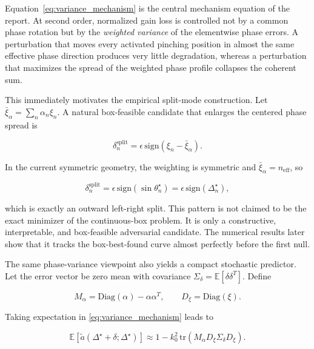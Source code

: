 Equation~\eqref{eq:variance_mechanism} is the central mechanism equation of the report. At second order, normalized gain loss is controlled not by a common phase rotation but by the \emph{weighted variance} of the elementwise phase errors. A perturbation that moves every activated pinching position in almost the same effective phase direction produces very little degradation, whereas a perturbation that maximizes the spread of the weighted phase profile collapses the coherent sum.

This immediately motivates the empirical split-mode construction. Let $\bar{\xi}_\alpha = \sum_n \alpha_n \xi_n$. A natural box-feasible candidate that enlarges the centered phase spread is

\begin{equation}
\delta_n^{\mathrm{split}}
= \epsilon\, \mathrm{sign}(\xi_n - \bar{\xi}_\alpha).
\label{eq:split_mode}
\end{equation}

In the current symmetric geometry, the weighting is symmetric and $\bar{\xi}_\alpha = n_{\mathrm{eff}}$, so

\begin{equation}
\delta_n^{\mathrm{split}}
= \epsilon\, \mathrm{sign}(\sin \theta_n^\star)
= \epsilon\, \mathrm{sign}(\Delta_n^\star),
\label{eq:split_mode_sym}
\end{equation}

which is exactly an outward left-right split. This pattern is not claimed to be the exact minimizer of the continuous-box problem. It is only a constructive, interpretable, and box-feasible adversarial candidate. The numerical results later show that it tracks the box-best-found curve almost perfectly before the first null.

The same phase-variance viewpoint also yields a compact stochastic predictor. Let the error vector be zero mean with covariance $\Sigma_\delta = \mathbb{E}[\delta \delta^T]$. Define

\begin{equation}
M_\alpha = \mathrm{Diag}(\alpha) - \alpha \alpha^T,
\qquad
D_\xi = \mathrm{Diag}(\xi).
\label{eq:matrix_defs}
\end{equation}

Taking expectation in \eqref{eq:variance_mechanism} leads to

\begin{equation}
\mathbb{E}\!\left[\tilde{a}(\Delta^\star+\delta;\Delta^\star)\right]
\approx
1 - k_0^2 \, \mathrm{tr}\!\left(M_\alpha D_\xi \Sigma_\delta D_\xi\right).
\label{eq:stochastic_predictor}
\end{equation}

